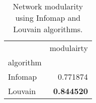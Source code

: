 \begin{table}[!htbp]
\centering
\caption{Network modularity using Infomap and Louvain algorithms.}
\label{tab:modularity}
\begin{tabular}{lr}
\toprule
 & modulairty \\
algorithm &  \\
\midrule
Infomap & 0.771874 \\
Louvain & \textbf{0.844520} \\
\bottomrule
\end{tabular}
\end{table}
